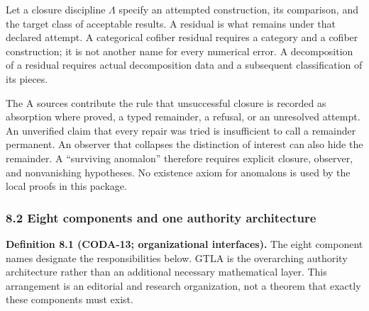 \documentclass[
  11pt,
]{article}
\begin{document}
Let a closure discipline \(\Lambda\) specify an attempted construction, its comparison, and the target class of acceptable results. A residual is what remains under that declared attempt. A categorical cofiber residual requires a category and a cofiber construction; it is not another name for every numerical error. A decomposition of a residual requires actual decomposition data and a subsequent classification of its pieces.

The A sources contribute the rule that unsuccessful closure is recorded as absorption where proved, a typed remainder, a refusal, or an unresolved attempt. An unverified claim that every repair was tried is insufficient to call a remainder permanent. An observer that collapses the distinction of interest can also hide the remainder. A ``surviving anomalon'' therefore requires explicit closure, observer, and nonvanishing hypotheses. No existence axiom for anomalons is used by the local proofs in this package.

\subsubsection{8.2 Eight components and one authority architecture}\label{eight-components-and-one-authority-architecture}

\textbf{Definition 8.1 (CODA-13; organizational interfaces).} The eight component names designate the responsibilities below. GTLA is the overarching authority architecture rather than an additional necessary mathematical layer. This arrangement is an editorial and research organization, not a theorem that exactly these components must exist.
\end{document}
